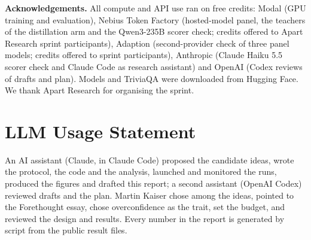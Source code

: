 \documentclass[10pt]{article}
\begin{document}
\textbf{Acknowledgements.} All compute and API use ran on free credits: Modal (GPU training and evaluation), Nebius Token Factory (hosted-model panel, the teachers of the distillation arm and the Qwen3-235B scorer check; credits offered to Apart Research sprint participants), Adaption (second-provider check of three panel models; credits offered to sprint participants), Anthropic (Claude Haiku 5.5 scorer check and Claude Code as research assistant) and OpenAI (Codex reviews of drafts and plan). Models and TriviaQA were downloaded from Hugging Face. We thank Apart Research for organising the sprint.

\section*{LLM Usage Statement}
An AI assistant (Claude, in Claude Code) proposed the candidate ideas, wrote the protocol, the code and the analysis, launched and monitored the runs, produced the figures and drafted this report; a second assistant (OpenAI Codex) reviewed drafts and the plan. Martin Kaiser chose among the ideas, pointed to the Forethought essay, chose overconfidence as the trait, set the budget, and reviewed the design and results. Every number in the report is generated by script from the public result files.
\end{document}
